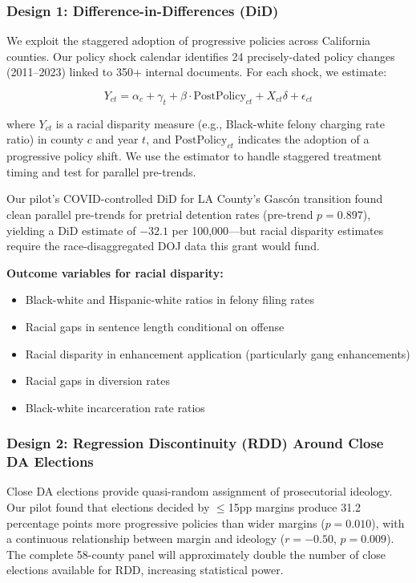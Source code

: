 \documentclass[12pt]{article}
\begin{document}
\subsubsection*{Design 1: Difference-in-Differences (DiD)}

We exploit the staggered adoption of progressive policies across California counties. Our policy shock calendar identifies 24 precisely-dated policy changes (2011--2023) linked to 350+ internal documents. For each shock, we estimate:

\begin{equation}
Y_{ct} = \alpha_c + \gamma_t + \beta \cdot \text{PostPolicy}_{ct} + X_{ct}\delta + \epsilon_{ct}
\end{equation}

\noindent where $Y_{ct}$ is a racial disparity measure (e.g., Black-white felony charging rate ratio) in county $c$ and year $t$, and $\text{PostPolicy}_{ct}$ indicates the adoption of a progressive policy shift. We use the \citet{callaway2021} estimator to handle staggered treatment timing and test for parallel pre-trends.

Our pilot's COVID-controlled DiD for LA County's Gasc\'{o}n transition found clean parallel pre-trends for pretrial detention rates (pre-trend $p = 0.897$), yielding a DiD estimate of $-32.1$ per 100,000---but racial disparity estimates require the race-disaggregated DOJ data this grant would fund.

\textbf{Outcome variables for racial disparity:}
\begin{itemize}
    \item Black-white and Hispanic-white ratios in felony filing rates
    \item Racial gaps in sentence length conditional on offense
    \item Racial disparity in enhancement application (particularly gang enhancements)
    \item Racial gaps in diversion rates
    \item Black-white incarceration rate ratios
\end{itemize}

\subsubsection*{Design 2: Regression Discontinuity (RDD) Around Close DA Elections}

Close DA elections provide quasi-random assignment of prosecutorial ideology. Our pilot found that elections decided by $\leq$15pp margins produce 31.2 percentage points more progressive policies than wider margins ($p = 0.010$), with a continuous relationship between margin and ideology ($r = -0.50$, $p = 0.009$). The complete 58-county panel will approximately double the number of close elections available for RDD, increasing statistical power.
\end{document}
